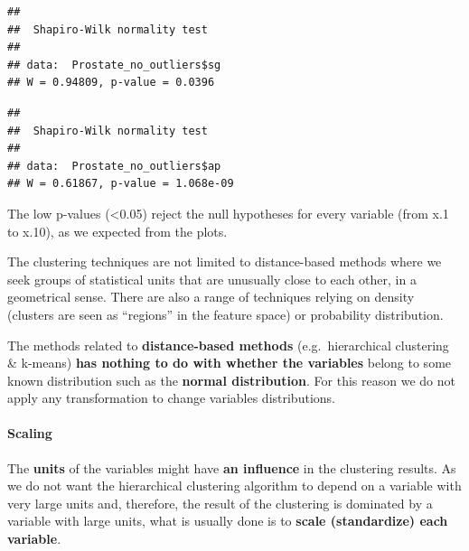 \documentclass[
]{article}
\newenvironment{Shaded}{\begin{snugshade}}{\end{snugshade}}
\newcommand{\FunctionTok}[1]{\textcolor[rgb]{0.00,0.00,0.00}{#1}}
\newcommand{\NormalTok}[1]{#1}
\newcommand{\SpecialCharTok}[1]{\textcolor[rgb]{0.00,0.00,0.00}{#1}}
\begin{document}
\begin{Shaded}
\end{Shaded}

\begin{verbatim}
## 
##  Shapiro-Wilk normality test
## 
## data:  Prostate_no_outliers$sg
## W = 0.94809, p-value = 0.0396
\end{verbatim}

\begin{Shaded}
\end{Shaded}

\begin{verbatim}
## 
##  Shapiro-Wilk normality test
## 
## data:  Prostate_no_outliers$ap
## W = 0.61867, p-value = 1.068e-09
\end{verbatim}

The low p-values (\textless0.05) reject the null hypotheses for every
variable (from x.1 to x.10), as we expected from the plots.

The clustering techniques are not limited to distance-based methods
where we seek groups of statistical units that are unusually close to
each other, in a geometrical sense. There are also a range of techniques
relying on density (clusters are seen as ``regions'' in the feature
space) or probability distribution.

The methods related to \textbf{distance-based methods}
(e.g.~hierarchical clustering \& k-means) \textbf{has nothing to do with
whether the variables} belong to some known distribution such as the
\textbf{normal distribution}. For this reason we do not apply any
transformation to change variables distributions.

\hypertarget{scaling}{%
\paragraph{Scaling}\label{scaling}}

The \textbf{units} of the variables might have \textbf{an influence} in
the clustering results. As we do not want the hierarchical clustering
algorithm to depend on a variable with very large units and, therefore,
the result of the clustering is dominated by a variable with large
units, what is usually done is to \textbf{scale (standardize) each
variable}.
\end{document}
